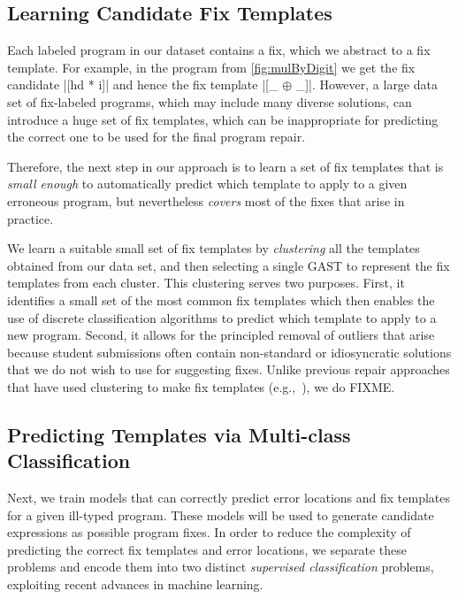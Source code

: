 \subsection{Learning Candidate Fix Templates}
\label{sec:overview:learn}

Each labeled program in our dataset contains a fix, which we abstract to a fix
template. For example, in the \mbd program from \autoref{fig:mulByDigit} we get
the fix candidate |[hd * i]| and hence the fix template |[_ $\oplus$ _]|.
However, a large data set of fix-labeled programs, which may include many
diverse solutions, can introduce a huge set of fix templates, which can be
inappropriate for predicting the correct one to be used for the final program
repair.

Therefore, the next step in our approach is to learn a set of fix templates
that is \emph{small enough} to automatically predict which template to apply to
a given erroneous program, but nevertheless \emph{covers} most of the fixes that
arise in practice.

 We learn a suitable small set of fix templates by
\emph{clustering} all the templates obtained from our data set, and then
selecting a single GAST to represent the fix templates from each cluster.
%
This clustering serves two purposes.
%
First, it identifies a small set of the most common fix templates which then
enables the use of discrete classification algorithms to predict which template
to apply to a new program.
%
Second, it allows for the principled removal of outliers that arise because
student submissions often contain non-standard or idiosyncratic solutions that
we do not wish to use for suggesting fixes.
Unlike previous repair approaches that have used clustering to make fix
templates (e.g.,~\cite{FIXME}), we do FIXME. 


\subsection{Predicting Templates via Multi-class Classification}
\label{sec:overview:predict}

Next, we train models that can correctly predict error locations and fix
templates for a given ill-typed program. These models will be used to generate
candidate expressions as possible program fixes. In order to reduce the
complexity of predicting the correct fix templates and error locations, we
separate these problems and encode them into two distinct \emph{supervised
classification} problems, exploiting recent advances in machine learning.

